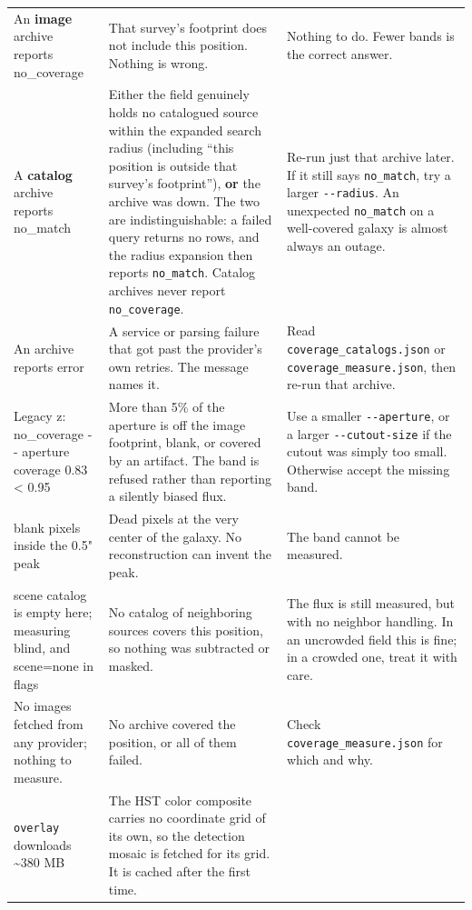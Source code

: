 \documentclass[11pt]{article}
\begin{document}
\begin{longtable}{T{3.5cm} L{4.2cm} L{6.9cm}}
{\normalfont An \textbf{image} archive reports} no\_coverage & That
  survey's footprint does not include this position. Nothing is wrong. &
  Nothing to do. Fewer bands is the correct answer. \\[2pt]
{\normalfont A \textbf{catalog} archive reports} no\_match & Either the
  field genuinely holds no catalogued source within the expanded search
  radius (including \enquote{this position is outside that survey's footprint}),
  \textbf{or} the archive was down. The two are indistinguishable: a
  failed query returns no rows, and the radius expansion then reports
  \texttt{no\_match}. Catalog archives never report
  \texttt{no\_coverage}. & Re-run just that archive later. If it still
  says \texttt{no\_match}, try a larger \texttt{-{}-radius}. An unexpected
  \texttt{no\_match} on a well-covered galaxy is almost always an
  outage. \\[2pt]
{\normalfont An archive reports} error & A service or parsing failure that
  got past the provider's own retries. The message names it. & Read
  \texttt{coverage\_catalogs.json} or \texttt{coverage\_measure.json},
  then re-run that archive. \\[2pt]
Legacy z: no\_coverage -{}- aperture coverage 0.83 < 0.95 & More than 5\%
  of the aperture is off the image footprint, blank, or covered by an
  artifact. The band is refused rather than reporting a silently biased
  flux. & Use a smaller \texttt{-{}-aperture}, or a larger
  \texttt{-{}-cutout-size} if the cutout was simply too small. Otherwise
  accept the missing band. \\[2pt]
blank pixels inside the 0.5" peak & Dead pixels at the very center of the
  galaxy. No reconstruction can invent the peak. & The band cannot be
  measured. \\[2pt]
scene catalog is empty here; measuring blind, and scene=none in flags & No
  catalog of neighboring sources covers this position, so nothing was
  subtracted or masked. & The flux is still measured, but with no neighbor
  handling. In an uncrowded field this is fine; in a crowded one, treat it
  with care. \\[2pt]
No images fetched from any provider; nothing to measure. & No archive
  covered the position, or all of them failed. & Check
  \texttt{coverage\_measure.json} for which and why. \\[2pt]
{\normalfont \texttt{overlay} downloads \textasciitilde380 MB} & The HST
  color composite carries no coordinate grid of its own, so the detection
  mosaic is fetched for its grid. It is cached after the first time. &

\end{longtable}
\end{document}
